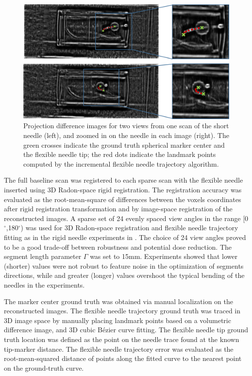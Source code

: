 \begin{figure}[t]
\centering
\includegraphics[width=\textwidth]{projection_diff_images.png}
\caption{Projection difference images for two views from one scan of the short needle (left), and zoomed in on the needle in each image (right). The green crosses indicate the ground truth spherical marker center and the flexible needle tip; the red dots indicate the landmark points computed by the incremental flexible needle trajectory algorithm.}
\label{proj_diff_fig}
\end{figure}

The full baseline scan was registered to each sparse scan with the flexible needle inserted using 3D Radon-space rigid registration. The registration accuracy was evaluated as the root-mean-square of differences between the voxels coordinates after rigid registration transformation and by image-space registration of the reconstructed images. A sparse set of 24 evenly spaced view angles in the range [0$^\circ$,180$^\circ$) was used for 3D Radon-space registration and flexible needle trajectory fitting as in the rigid needle experiments in \cite{medan2017reduced}. The choice of 24 view angles proved to be a good trade-off between robustness and potential dose reduction. The segment length parameter $\Gamma$ was set to 15mm. Experiments showed that lower (shorter) values were not robust to feature noise in the optimization of segments directions, while and greater (longer) values overshoot the typical bending of the needles in the experiments.

The marker center ground truth was obtained via manual localization on the reconstructed images. The flexible needle trajectory ground truth was traced in 3D image space by manually placing landmark points based on a volumetric difference image, and 3D cubic B\'ezier curve fitting. The flexible needle tip ground truth location was defined as the point on the needle trace found at the known tip-marker distance. The flexible needle trajectory error was evaluated as the root-mean-squared distance of points along the fitted curve to the nearest point on the ground-truth curve.

